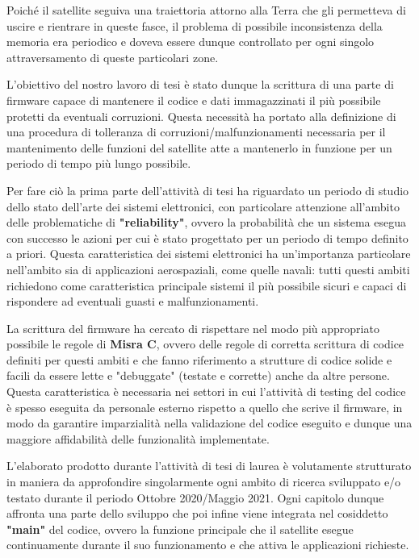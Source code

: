 \documentclass[LaM,binding=0.6cm,oneside]{../sapthesis}
\begin{document}
Poiché il satellite seguiva una traiettoria attorno alla Terra che gli permetteva di uscire e rientrare in queste fasce, il problema di possibile inconsistenza della memoria era periodico e doveva essere dunque controllato per ogni singolo attraversamento di queste particolari zone.

L'obiettivo del nostro lavoro di tesi è stato dunque la scrittura di una parte di firmware capace di mantenere il codice e dati immagazzinati il più possibile protetti da eventuali corruzioni. Questa necessità ha portato alla definizione di una procedura di tolleranza di corruzioni/malfunzionamenti necessaria per il mantenimento delle funzioni del satellite atte a mantenerlo in funzione per un periodo di tempo più lungo possibile. 

Per fare ciò la prima parte dell'attività di tesi ha riguardato un periodo di studio dello stato dell'arte dei sistemi elettronici, con particolare attenzione all'ambito delle problematiche di \textbf{"reliability"}, ovvero la probabilità che un sistema esegua con successo le azioni per cui è stato progettato per un periodo di tempo definito a priori. Questa caratteristica dei sistemi elettronici ha un'importanza particolare nell'ambito sia di applicazioni aerospaziali, come quelle navali: tutti questi ambiti richiedono come caratteristica principale sistemi il più possibile sicuri e capaci di rispondere ad eventuali guasti e malfunzionamenti.

La scrittura del firmware ha cercato di rispettare nel modo più appropriato possibile le regole di \textbf{Misra C}, ovvero delle regole di corretta scrittura di codice definiti per questi ambiti e che fanno riferimento a strutture di codice solide e facili da essere lette e "debuggate" (testate e corrette) anche da altre persone. Questa caratteristica è necessaria nei settori in cui l'attività di testing del codice è spesso eseguita da personale esterno rispetto a quello che scrive il firmware, in modo da garantire imparzialità nella validazione del codice eseguito e dunque una maggiore affidabilità delle funzionalità implementate.
    
L'elaborato prodotto durante l'attività di tesi di laurea è volutamente strutturato in maniera da approfondire singolarmente ogni ambito di ricerca sviluppato e/o testato durante il periodo Ottobre 2020/Maggio 2021.
Ogni capitolo dunque affronta una parte dello sviluppo che poi infine viene integrata nel cosiddetto \textbf{"main"} del codice, ovvero la funzione principale che il satellite esegue continuamente durante il suo funzionamento e che attiva le applicazioni richieste.
    
\end{document}
